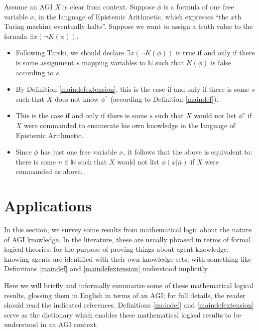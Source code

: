 \documentclass[runningheads]{llncs}
\begin{document}
\begin{example}
  Assume an AGI $X$ is clear from context.
  Suppose $\phi$ is a formula of one free variable $x$, in the language of Epistemic Arithmetic,
  which expresses ``the $x$th Turing machine eventually halts''. Suppose we want to
  assign a truth value to the formula $\exists x (\neg K(\phi))$.
  \begin{itemize}
  \item Following Tarski, we should declare $\exists x (\neg K(\phi))$
  is true if and only if there is some assignment $s$ mapping variables to $\mathbb N$
  such that $K(\phi)$ is false according to $s$.
  \item By Definition \ref{maindefextension}, this is the case if and only if
  there is some $s$ such that
  $X$ does not know $\phi^s$ (according to Definition \ref{maindef}).
  \item
  This is the case if and only if there is some $s$ such that $X$ would not
  list $\phi^s$ if $X$ were commanded
  to enumerate his own knowledge in the language of Epistemic Arithmetic.
  \item
  Since $\phi$ has just one free variable $x$, it follows that the above is equivalent to:
  there is some $n\in\mathbb N$ such that $X$ would not list $\phi(x|\overline n)$
  if $X$ were commanded as above.
  \end{itemize}
\end{example}

\section{Applications}
\label{appsection}

In this section, we survey some results from mathematical logic about the nature
of AGI knowledge. In the literature, these are usually phrased in terms of
formal logical theories: for the purpose of proving things about agent knowledge,
knowing agents are identified with their own knowledge-sets,
with something like Definitions \ref{maindef} and \ref{maindefextension} understood
implicitly.

Here we will briefly and informally summarize some of these mathematical
logical results, glossing them in English in terms of an AGI; for full details,
the reader should read the indicated references. Definitions \ref{maindef}
and \ref{maindefextension} serve as the dictionary which enables these mathematical
logical results to be understood in an AGI context.
\end{document}
